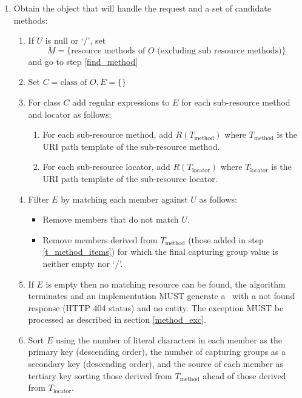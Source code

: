 \begin{enumerate}
\item \label{find_object} Obtain the object that will handle the request and a set of candidate methods:

\begin{enumerate}
\item \label{check_null} If $U$ is null or \lq/\rq, set
$$M = \{\mbox{resource methods of } O \mbox{ (excluding sub resource methods)}\}$$
and go to step \ref{find_method}

\item Set $C=\mbox{class of } O, E=\{\}$

\item For class $C$ add regular expressions to $E$ for each sub-resource method and locator as follows:
\begin{enumerate}
\item \label{t_method_items} For each sub-resource method, add $R(T_{\mbox{method}})$ where $T_{\mbox{method}}$ is the URI path template of the sub-resource method.
\item For each sub-resource locator, add $R(T_{\mbox{locator}})$ where $T_{\mbox{locator}}$ is the  URI path template of the sub-resource locator.
\end{enumerate}

\item Filter $E$ by matching each member against $U$ as follows:
\begin{itemize}
\item Remove members that do not match $U$.
\item Remove members derived from $T_{\mbox{method}}$ (those added in step \ref{t_method_items}) for which the final capturing group value is neither empty nor \lq/\rq.
\end{itemize}

\item If $E$ is empty then no matching resource can be found, the algorithm terminates and an implementation MUST generate a \WebAppExc\ with a not found response (HTTP 404 status) and no entity. The exception MUST be processed as described in section \ref{method_exc}.

\item Sort $E$ using the number of literal characters in each member as the primary key (descending order), the number of capturing groups as a secondary key (descending order), and the source of each member as tertiary key sorting those derived from $T_{\mbox{method}}$ ahead of those derived from $T_{\mbox{locator}}$.


\end{enumerate}
\end{enumerate}
